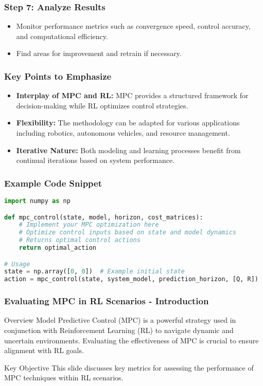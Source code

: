 \documentclass[aspectratio=169]{beamer}
\begin{document}
\begin{frame}[fragile]
    \frametitle{Step 7: Analyze Results}
    \begin{itemize}
        \item Monitor performance metrics such as convergence speed, control accuracy, and computational efficiency.
        \item Find areas for improvement and retrain if necessary.
    \end{itemize}
\end{frame}

\begin{frame}[fragile]
    \frametitle{Key Points to Emphasize}
    \begin{itemize}
        \item \textbf{Interplay of MPC and RL:} MPC provides a structured framework for decision-making while RL optimizes control strategies.
        \item \textbf{Flexibility:} The methodology can be adapted for various applications including robotics, autonomous vehicles, and resource management.
        \item \textbf{Iterative Nature:} Both modeling and learning processes benefit from continual iterations based on system performance.
    \end{itemize}
\end{frame}

\begin{frame}[fragile]
    \frametitle{Example Code Snippet}
    \begin{lstlisting}[language=Python]
import numpy as np

def mpc_control(state, model, horizon, cost_matrices):
    # Implement your MPC optimization here
    # Optimize control inputs based on state and model dynamics
    # Returns optimal control actions
    return optimal_action

# Usage
state = np.array([0, 0])  # Example initial state
action = mpc_control(state, system_model, prediction_horizon, [Q, R])
\end{lstlisting}
\end{frame}

\begin{frame}[fragile]
    \frametitle{Evaluating MPC in RL Scenarios - Introduction}
    \begin{block}{Overview}
        Model Predictive Control (MPC) is a powerful strategy used in conjunction with Reinforcement Learning (RL) to navigate dynamic and uncertain environments. Evaluating the effectiveness of MPC is crucial to ensure alignment with RL goals.
    \end{block}
    \begin{block}{Key Objective}
        This slide discusses key metrics for assessing the performance of MPC techniques within RL scenarios.
    \end{block}
\end{frame}
\end{document}
